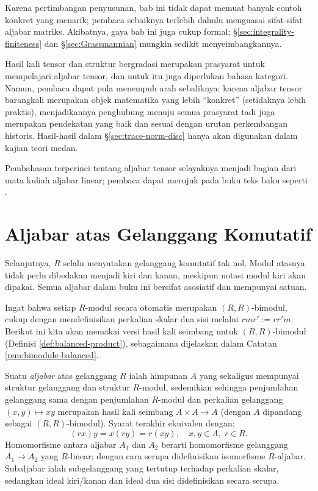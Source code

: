 \begin{wenxintishi}
	Karena pertimbangan penyusunan, bab ini tidak dapat memuat banyak contoh konkret yang menarik; pembaca sebaiknya terlebih dahulu menguasai sifat-sifat aljabar matriks. Akibatnya, gaya bab ini juga cukup formal; \S\ref{sec:integrality-finiteness} dan \S\ref{sec:Grassmannian} mungkin sedikit menyeimbangkannya. 

	Hasil kali tensor dan struktur bergradasi merupakan prasyarat untuk mempelajari aljabar tensor, dan untuk itu juga diperlukan bahasa kategori. Namun, pembaca dapat pula menempuh arah sebaliknya: karena aljabar tensor barangkali merupakan objek matematika yang lebih ``konkret'' (setidaknya lebih praktis), menjadikannya penghubung menuju semua prasyarat tadi juga merupakan pendekatan yang baik dan sesuai dengan urutan perkembangan historis. Hasil-hasil dalam \S\ref{sec:trace-norm-disc} hanya akan digunakan dalam kajian teori medan.
	
	Pembahasan terperinci tentang aljabar tensor selayaknya menjadi bagian dari mata kuliah aljabar linear; pembaca dapat merujuk pada buku teks baku seperti \cite[Bab 6]{Xi18}.
\end{wenxintishi}

\section{Aljabar atas Gelanggang Komutatif}\label{sec:algebra-def}
Selanjutnya, $R$ selalu menyatakan gelanggang komutatif tak nol. Modul atasnya tidak perlu dibedakan menjadi kiri dan kanan, meskipun notasi modul kiri akan dipakai. Semua aljabar dalam buku ini bersifat asosiatif dan mempunyai satuan.

Ingat bahwa setiap $R$-modul secara otomatis merupakan $(R,R)$-bimodul, cukup dengan mendefinisikan perkalian skalar dua sisi melalui $rmr' := rr'm$. Berikut ini kita akan memakai versi hasil kali seimbang untuk $(R,R)$-bimodul (Definisi \ref{def:balanced-product}), sebagaimana dijelaskan dalam Catatan \ref{rem:bimodule-balanced}.

\begin{definition}\label{def:algebra-naive}
	Suatu \emph{aljabar} atas gelanggang $R$ ialah himpunan $A$ yang sekaligus mempunyai struktur gelanggang dan struktur $R$-modul, sedemikian sehingga penjumlahan gelanggang sama dengan penjumlahan $R$-modul dan perkalian gelanggang $(x,y) \mapsto xy$ merupakan hasil kali seimbang $A \times A \to A$ (dengan $A$ dipandang sebagai $(R,R)$-bimodul). Syarat terakhir ekuivalen dengan:
	\[ (rx)y = x(ry) = r(xy), \quad x,y \in A, \; r \in R. \]
	Homomorfisme antara aljabar $A_1$ dan $A_2$ berarti homomorfisme gelanggang $A_1 \to A_2$ yang $R$-linear; dengan cara serupa didefinisikan isomorfisme $R$-aljabar. Subaljabar ialah subgelanggang yang tertutup terhadap perkalian skalar, sedangkan ideal kiri/kanan dan ideal dua sisi didefinisikan secara serupa.
\end{definition}

